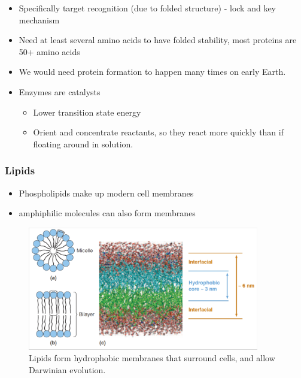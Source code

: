 \documentclass[]{article}
\begin{document}
\begin{itemize}
	\item  Specifically target recognition (due to folded
	structure) - lock and key mechanism
	\item  Need at least several amino acids to have
	folded stability, most proteins are 50+ amino
	acids
	\item We would need protein formation to happen many times on early Earth.
	\item Enzymes are catalysts
	\begin{itemize}
		\item Lower transition state energy
		\item Orient and concentrate reactants, so they react more quickly than if floating around in solution.
	\end{itemize}
\end{itemize}



\subsubsection{Lipids}
\cite[14.2 Lipids \& Triglycerides]{brown2009chemistry}

\begin{itemize}
	\item Phospholipids make up modern cell
	membranes
	\item amphiphilic molecules can also form
	membranes
\end{itemize}

\begin{figure}[H]
	\caption{Lipids form hydrophobic membranes that surround cells, and allow Darwinian evolution.}\label{fig:Lipids} 
	\includegraphics[width=0.9\textwidth]{Lipids}
\end{figure}
\end{document}
